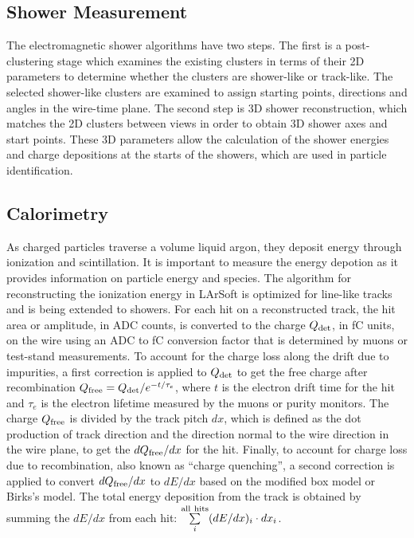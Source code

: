 \subsection{Shower Measurement}


The electromagnetic shower algorithms have two
steps. The first is a post-clustering stage which examines the
existing clusters in terms of their 2D parameters to determine whether
the clusters are shower-like or track-like. 
The selected shower-like clusters are examined to assign starting points,
directions and angles in the wire-time plane. The second step is 
3D shower reconstruction, which
matches the 2D clusters between views in order to obtain 3D shower axes and start points.
These 3D parameters allow the calculation of the shower energies and charge
depositions at the starts of the showers, which are used in particle
identification. 


\subsection{Calorimetry}


As charged particles traverse a volume liquid argon, they deposit
energy through ionization and scintillation. It is important to
measure the energy depotion as it provides information on particle
energy and species. The algorithm for reconstructing the ionization
energy in LArSoft is optimized for line-like tracks and is being
extended to showers. 
For each hit on a reconstructed track, the hit area or amplitude, in ADC counts, is
converted to the charge $Q_{\rm{det}}$, in fC units, on the wire using an
ADC to fC conversion factor that is determined by muons or test-stand
measurements. To account for the charge loss along the drift due to
impurities, a first correction is applied to $Q_{\rm{det}}$ to get the free
charge after recombination $Q_{\rm{free}} = Q_{\rm{det}}/e^{-t/\tau_{e}}$, where
$t$ is the electron drift time for the hit and $\tau_{e}$ is the
electron lifetime measured by the muons or purity monitors. The charge
$Q_{\rm{free}}$ is divided by the track pitch $dx$, which is defined as the
dot production of track direction and the direction normal to the wire
direction in the wire plane, to get the $dQ_{\rm{free}}/dx$ for the
hit. Finally, to account for charge loss due to recombination, also
known as ``charge quenching'', a second correction is applied to
convert $dQ_{\rm{free}}/dx$ to $dE/dx$ based on the modified box model
\cite{Thomas:1987zz} or Birks's model\cite{Birks:1964zz}. The total energy
deposition from the track is obtained by summing the $dE/dx$ from each
hit: $\sum\limits_{i}^{\rm{all\ hits}}(dE/dx)_{i}\cdot dx_{i}$.

